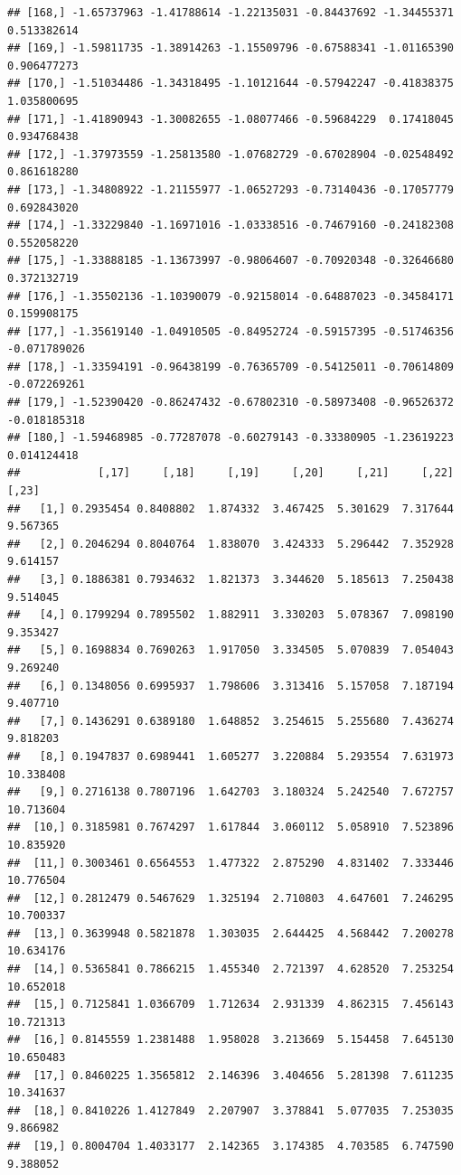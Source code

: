 \documentclass{article}\usepackage[]{graphicx}\usepackage[]{color}
\makeatletter
\newenvironment{kframe}{%
 \def\at@end@of@kframe{}%
 \ifinner\ifhmode%
  \def\at@end@of@kframe{\end{minipage}}%
  \begin{minipage}{\columnwidth}%
 \fi\fi%
 \def\FrameCommand##1{\hskip\@totalleftmargin \hskip-\fboxsep
 \colorbox{shadecolor}{##1}\hskip-\fboxsep
     \hskip-\linewidth \hskip-\@totalleftmargin \hskip\columnwidth}%
 \MakeFramed {\advance\hsize-\width
   \@totalleftmargin\z@ \linewidth\hsize
   \@setminipage}}%
 {\par\unskip\endMakeFramed%
 \at@end@of@kframe}
\newenvironment{knitrout}{}{} %
\makeatother
\begin{document}
\begin{knitrout}
\begin{kframe}
\begin{verbatim}
## [168,] -1.65737963 -1.41788614 -1.22135031 -0.84437692 -1.34455371  0.513382614
## [169,] -1.59811735 -1.38914263 -1.15509796 -0.67588341 -1.01165390  0.906477273
## [170,] -1.51034486 -1.34318495 -1.10121644 -0.57942247 -0.41838375  1.035800695
## [171,] -1.41890943 -1.30082655 -1.08077466 -0.59684229  0.17418045  0.934768438
## [172,] -1.37973559 -1.25813580 -1.07682729 -0.67028904 -0.02548492  0.861618280
## [173,] -1.34808922 -1.21155977 -1.06527293 -0.73140436 -0.17057779  0.692843020
## [174,] -1.33229840 -1.16971016 -1.03338516 -0.74679160 -0.24182308  0.552058220
## [175,] -1.33888185 -1.13673997 -0.98064607 -0.70920348 -0.32646680  0.372132719
## [176,] -1.35502136 -1.10390079 -0.92158014 -0.64887023 -0.34584171  0.159908175
## [177,] -1.35619140 -1.04910505 -0.84952724 -0.59157395 -0.51746356 -0.071789026
## [178,] -1.33594191 -0.96438199 -0.76365709 -0.54125011 -0.70614809 -0.072269261
## [179,] -1.52390420 -0.86247432 -0.67802310 -0.58973408 -0.96526372 -0.018185318
## [180,] -1.59468985 -0.77287078 -0.60279143 -0.33380905 -1.23619223  0.014124418
##            [,17]     [,18]     [,19]     [,20]     [,21]     [,22]     [,23]
##   [1,] 0.2935454 0.8408802  1.874332  3.467425  5.301629  7.317644  9.567365
##   [2,] 0.2046294 0.8040764  1.838070  3.424333  5.296442  7.352928  9.614157
##   [3,] 0.1886381 0.7934632  1.821373  3.344620  5.185613  7.250438  9.514045
##   [4,] 0.1799294 0.7895502  1.882911  3.330203  5.078367  7.098190  9.353427
##   [5,] 0.1698834 0.7690263  1.917050  3.334505  5.070839  7.054043  9.269240
##   [6,] 0.1348056 0.6995937  1.798606  3.313416  5.157058  7.187194  9.407710
##   [7,] 0.1436291 0.6389180  1.648852  3.254615  5.255680  7.436274  9.818203
##   [8,] 0.1947837 0.6989441  1.605277  3.220884  5.293554  7.631973 10.338408
##   [9,] 0.2716138 0.7807196  1.642703  3.180324  5.242540  7.672757 10.713604
##  [10,] 0.3185981 0.7674297  1.617844  3.060112  5.058910  7.523896 10.835920
##  [11,] 0.3003461 0.6564553  1.477322  2.875290  4.831402  7.333446 10.776504
##  [12,] 0.2812479 0.5467629  1.325194  2.710803  4.647601  7.246295 10.700337
##  [13,] 0.3639948 0.5821878  1.303035  2.644425  4.568442  7.200278 10.634176
##  [14,] 0.5365841 0.7866215  1.455340  2.721397  4.628520  7.253254 10.652018
##  [15,] 0.7125841 1.0366709  1.712634  2.931339  4.862315  7.456143 10.721313
##  [16,] 0.8145559 1.2381488  1.958028  3.213669  5.154458  7.645130 10.650483
##  [17,] 0.8460225 1.3565812  2.146396  3.404656  5.281398  7.611235 10.341637
##  [18,] 0.8410226 1.4127849  2.207907  3.378841  5.077035  7.253035  9.866982
##  [19,] 0.8004704 1.4033177  2.142365  3.174385  4.703585  6.747590  9.388052

\end{verbatim}
\end{kframe}
\end{knitrout}
\end{document}

